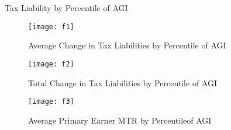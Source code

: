 \documentclass{article}
\begin{document}
\begin{table}[H]
\caption{Tax Liability by Percentile of AGI}

\begin{center}
\begin{adjustbox}{max width=\textwidth}

\end{adjustbox}
\end{center}
\end{table}

\begin{figure}[H]
\centering
\caption{Average Change in Tax Liabilities by Percentile of AGI}
\texttt{[image: f1]}
\end{figure}

\begin{figure}[H]
\centering
\caption{Total Change in Tax Liabilities by Percentile of AGI}
\texttt{[image: f2]}
\end{figure}

\begin{figure}[H]
\centering
\caption{Average Primary Earner MTR by Percentileof AGI}
\texttt{[image: f3]}
\end{figure}
\end{document}
